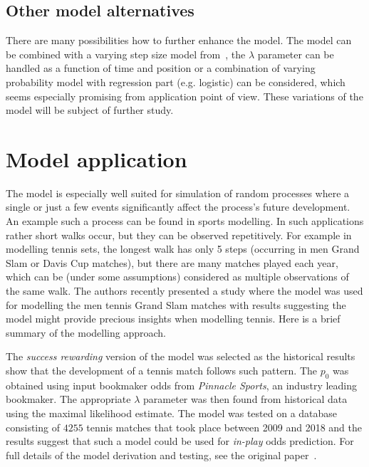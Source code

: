 \documentclass[runningheads]{CMSIM}
\begin{document}
    \subsection{Other model alternatives}\label{subsec:other-model-alternatives}

    There are many possibilities how to further enhance the model.
    The
    model can be combined with a varying step size model from~\cite{turban2010random},
    the $\lambda$ parameter can be handled as a function of time and
    position or a combination of varying probability model with regression
    part (e.g. logistic) can be considered, which seems especially promising
    from application point of view.
    These variations of the model will be subject of further study.


    \section{Model application}\label{sec:Model-application}

    The model is especially well suited for simulation of random processes where a single or just a few events significantly affect the process's future development.
    An example such a process can be found in sports modelling.
    In such applications rather short walks occur, but they can be observed repetitively.
    For example in modelling tennis sets, the longest walk has only 5 steps (occurring in men Grand Slam or Davis Cup matches), but there are many matches played each year,
    which can be (under some assumptions) considered as multiple observations of the same walk.
    The authors recently presented a study where the model was used for modelling the men tennis Grand Slam matches with results suggesting the model might provide precious insights when modelling tennis.
    Here is a brief summary of the modelling approach.

    The \emph{success rewarding} version of the model was selected as the historical results show that the development of a tennis match follows such pattern.
    The $p_{0}$ was obtained using input bookmaker odds from \emph{Pinnacle Sports}, an industry leading bookmaker.
    The appropriate $\lambda$ parameter was then found from historical data using the maximal likelihood estimate.
    The model was tested on a database consisting of $4255$ tennis matches that took place between 2009 and 2018 and the results suggest that such a model could be used for \emph{in-play} odds prediction.
    For full details of the model derivation and testing, see the original paper~\cite{ja2019mathsport_proc}.
\end{document}
